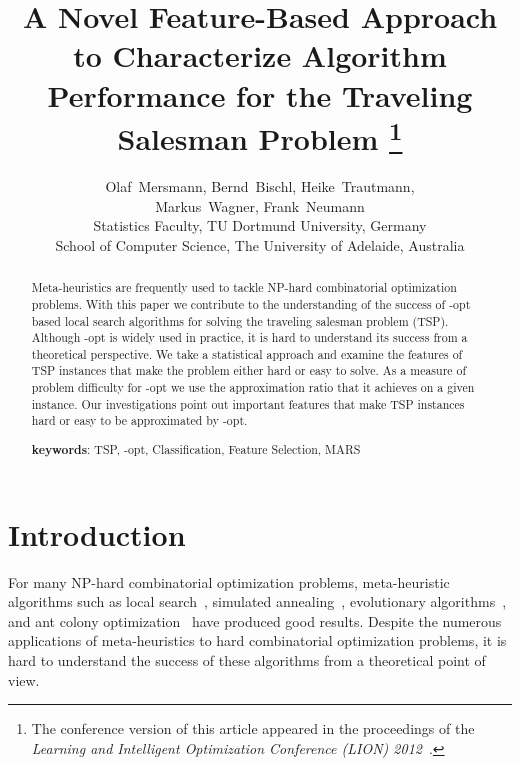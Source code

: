 \documentclass{article}
\begin{document}
	
\title{A Novel Feature-Based Approach to Characterize Algorithm
  Performance for the Traveling Salesman Problem
  \thanks{The conference version of this article appeared in the
    proceedings of the \emph{Learning and Intelligent Optimization
      Conference (LION) 2012}~\cite{mersmann2012}.}  }

\author{Olaf~Mersmann, Bernd~Bischl, Heike~Trautmann, \\
Markus~Wagner, Frank~Neumann\\
  Statistics Faculty, TU Dortmund University, Germany \\
  School of Computer Science, The University of Adelaide, Australia\\
  }

\maketitle

\begin{abstract}
  Meta-heuristics are frequently used to tackle NP-hard combinatorial
  optimization problems.  With this paper we contribute to the
  understanding of the success of -opt based local search
  algorithms for solving the traveling salesman problem
  (TSP). Although -opt is widely used in practice, it is hard to
  understand its success from a theoretical perspective. We take a
  statistical approach and examine the features of TSP instances that
  make the problem either hard or easy to solve. As a measure of
  problem difficulty for -opt we use the approximation ratio that
  it achieves on a given instance. Our investigations point out
  important features that make TSP instances hard or easy to be
  approximated by -opt.

  \textbf{keywords}: TSP, -opt, Classification, Feature Selection, MARS
\end{abstract}



\section{Introduction}

For many NP-hard combinatorial optimization problems, meta-heuristic
algorithms such as local search~\cite{HoosS2004}, simulated
annealing~\cite{LaarAar97}, evolutionary algorithms~\cite{EibSmi2007},
and ant colony optimization~\cite{DorigoStuetzleACOBook} have produced
good results. Despite the numerous applications of meta-heuristics to
hard combinatorial optimization problems, it is hard to understand the
success of these algorithms from a theoretical point of view.
\end{document}

